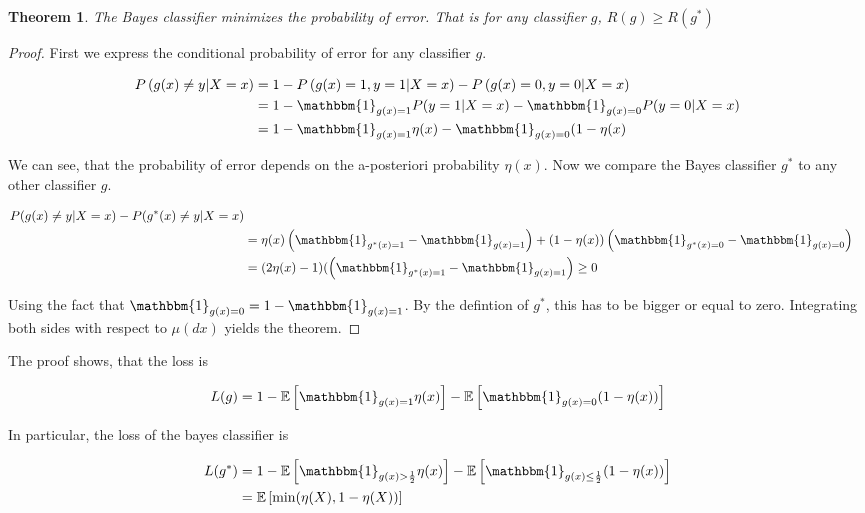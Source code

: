 \documentclass[12pt, authoryear]{elsarticle}
\newtheorem{theorem}{Theorem}
\begin{document}
\begin{theorem}
The Bayes classifier minimizes the probability of error. That is for any classifier $g$, $R(g) \geq R(g^*)$
\end{theorem}

\begin{proof}
First we express the conditional probability of error for any classifier $g$.

\begin{align*}
P\left( g(x) \neq y |X=x \right) &= 1- P\left( g(x)=1,y=1 | X=x\right) - P\left(g(x) = 0, y=0 |X=x \right) \\
&= 1 - \mathbbm{1}_{g(x)=1} P(y=1|X=x) - \mathbbm{1}_{g(x)=0} P(y=0|X=x) \\
&= 1-  \mathbbm{1}_{g(x)=1} \eta(x) -  \mathbbm{1}_{g(x)=0} (1-\eta(x) 
\end{align*}

We can see, that the probability of error depends on the a-posteriori probability $\eta(x)$. Now we compare the Bayes classifier $g^*$ to any other classifier $g$.

\begin{align*}
P(g(x) \neq y |X=x) - P(g^*(x) \neq y | X= x) \\
&= \eta(x) \left( \mathbbm{1}_{g^*(x)=1} - \mathbbm{1}_{g(x)=1} \right) + (1-\eta(x)) \left( \mathbbm{1}_{g^*(x)=0} - \mathbbm{1}_{g(x)=0} \right) \\
&= (2\eta(x) -1 ) (\left( \mathbbm{1}_{g^*(x)=1} - \mathbbm{1}_{g(x)=1} \right) \geq 0 
\end{align*}

Using the fact that $\mathbbm{1}_{g(x) = 0} = 1 -\mathbbm{1}_{g(x) = 1} $. By the defintion of $g^*$, this has to be bigger or equal to zero. Integrating both sides with respect to $\mu(dx)$ yields the theorem. 

\end{proof}

The proof shows, that the loss is

$$L(g) = 1 - \mathbb{E} \left[ \mathbbm{1}_{g(x)=1} \eta(x) \right] -  \mathbb{E} \left[ \mathbbm{1}_{g(x)=0} (1 - \eta(x) )  \right]$$

In particular, the loss of the bayes classifier is

\begin{align*}
L(g^*) &= 1- \mathbb{E} \left[ \mathbbm{1}_{g(x)>\frac{1}{2}} \eta(x) \right] -  \mathbb{E} \left[ \mathbbm{1}_{g(x) \leq \frac{1}{2}} (1 - \eta(x) )  \right] \\
&= \mathbb { E } \left[ \min ( \eta ( X ) , 1 - \eta ( X ) ) \right]
\end{align*}
\end{document}

